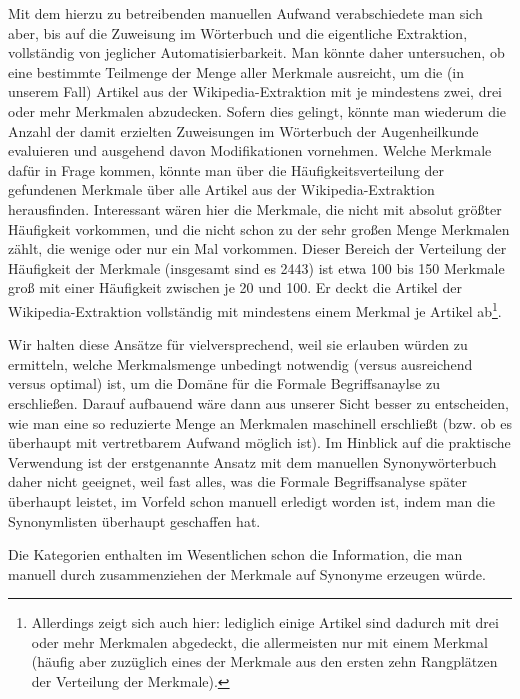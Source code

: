 \documentclass[pagesize,DIV=calc,12pt,draft]{scrreprt}
\begin{document}
Mit dem hierzu zu betreibenden manuellen Aufwand verabschiedete man sich aber, bis auf die Zuweisung im Wörterbuch und die eigentliche Extraktion, vollständig von jeglicher Automatisierbarkeit.
Man könnte daher untersuchen, ob eine bestimmte Teilmenge der Menge aller Merkmale ausreicht, um die (in unserem Fall) Artikel aus der Wikipedia-Extraktion mit je mindestens zwei, drei oder mehr Merkmalen abzudecken.
Sofern dies gelingt, könnte man wiederum die Anzahl der damit erzielten Zuweisungen im Wörterbuch der Augenheilkunde evaluieren und ausgehend davon Modifikationen vornehmen.
Welche Merkmale dafür in Frage kommen, könnte man über die Häufigkeitsverteilung der gefundenen Merkmale über alle Artikel aus der Wikipedia-Extraktion herausfinden.
Interessant wären hier die Merkmale, die nicht mit absolut größter Häufigkeit vorkommen, und die nicht schon zu der sehr großen Menge Merkmalen zählt, die wenige oder nur ein Mal vorkommen.
Dieser Bereich der Verteilung der Häufigkeit der Merkmale (insgesamt sind es 2443) ist etwa 100 bis 150 Merkmale groß mit einer Häufigkeit zwischen je 20 und 100.
Er deckt die Artikel der Wikipedia-Extraktion vollständig mit mindestens einem Merkmal je Artikel ab\footnote{Allerdings zeigt sich auch hier: lediglich einige Artikel sind dadurch mit drei oder mehr Merkmalen abgedeckt, die allermeisten nur mit einem Merkmal (häufig aber zuzüglich eines der Merkmale aus den ersten zehn Rangplätzen der Verteilung der Merkmale).}.

Wir halten diese Ansätze für vielversprechend, weil sie erlauben würden zu ermitteln, welche Merkmalsmenge unbedingt notwendig (versus ausreichend versus optimal) ist, um die Domäne für die Formale Begriffsanaylse zu erschließen.
Darauf aufbauend wäre dann aus unserer Sicht besser zu entscheiden, wie man eine so reduzierte Menge an Merkmalen maschinell erschließt (bzw. ob es überhaupt mit vertretbarem Aufwand möglich ist).
Im Hinblick auf die praktische Verwendung ist der erstgenannte Ansatz mit dem manuellen Synonywörterbuch daher nicht geeignet, weil fast alles, was die Formale Begriffsanalyse später überhaupt leistet, im Vorfeld schon manuell erledigt worden ist, indem man die Synonymlisten überhaupt geschaffen hat.

Die Kategorien enthalten im Wesentlichen schon die Information, die man manuell durch zusammenziehen der Merkmale auf Synonyme erzeugen würde.
\end{document}
